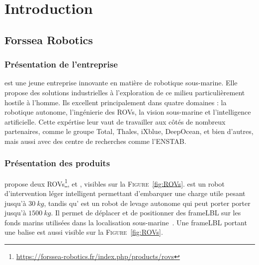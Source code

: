 \chapter{Introduction}
\label{chapter:introduction}
	
	\section{Forssea Robotics}

		\subsection{Présentation de l'entreprise}

			\forssea{} est une jeune entreprise innovante en matière de robotique sous-marine. Elle propose des solutions industrielles à l'exploration de ce milieu particulièrement hostile à l'homme. Ils excellent principalement dans quatre domaines : la robotique autonome, l'ingénierie des \gls{ROV}s, la vision sous-marine et l'intelligence artificielle. Cette expértise leur vaut de travailler aux côtés de nombreux partenaires, comme le groupe Total, Thales, iXblue, DeepOcean, et bien d'autres, mais aussi avec des centre de recherches comme l'\gls{ENSTAB}.

		\subsection{Présentation des produits}

			\forssea{} propose deux \gls{ROV}s\footnote{\url{https://forssea-robotics.fr/index.php/products/rovs}}, \argos{} et \atoll{}, visibles sur la \textsc{Figure}~\ref{fig:ROVs}. \argos{} est un robot d'intervention léger intelligent permettant d'embarquer une charge utile pesant jusqu'à $30\ kg$, tandis qu'\atoll{} est un robot de levage autonome qui peut porter porter jusqu'à $1500\ kg$. Il permet de déplacer et de positionner des \gls{frameLBL} sur les fonds marins utilisées dans la localisation sous-marine~\cite{milne1983underwater}. Une \gls{frameLBL} portant une balise est aussi visible sur la \textsc{Figure}~\ref{fig:ROVs}.

